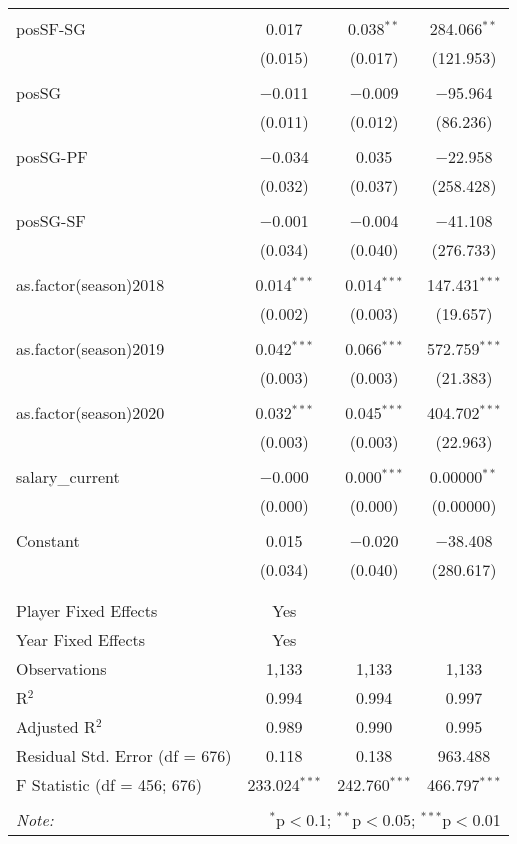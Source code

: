 \documentclass[a4paper,11pt]{article}
\begin{document}
\begin{table}[!htbp]
{\begin{tabular}{@{\extracolsep{5pt}}lccc}
  & & & \\ 
 posSF-SG & 0.017 & 0.038$^{**}$ & 284.066$^{**}$ \\ 
  & (0.015) & (0.017) & (121.953) \\ 
  & & & \\ 
 posSG & $-$0.011 & $-$0.009 & $-$95.964 \\ 
  & (0.011) & (0.012) & (86.236) \\ 
  & & & \\ 
 posSG-PF & $-$0.034 & 0.035 & $-$22.958 \\ 
  & (0.032) & (0.037) & (258.428) \\ 
  & & & \\ 
 posSG-SF & $-$0.001 & $-$0.004 & $-$41.108 \\ 
  & (0.034) & (0.040) & (276.733) \\ 
  & & & \\ 
 as.factor(season)2018 & 0.014$^{***}$ & 0.014$^{***}$ & 147.431$^{***}$ \\ 
  & (0.002) & (0.003) & (19.657) \\ 
  & & & \\ 
 as.factor(season)2019 & 0.042$^{***}$ & 0.066$^{***}$ & 572.759$^{***}$ \\ 
  & (0.003) & (0.003) & (21.383) \\ 
  & & & \\ 
 as.factor(season)2020 & 0.032$^{***}$ & 0.045$^{***}$ & 404.702$^{***}$ \\ 
  & (0.003) & (0.003) & (22.963) \\ 
  & & & \\ 
 salary\_current & $-$0.000 & 0.000$^{***}$ & 0.00000$^{**}$ \\ 
  & (0.000) & (0.000) & (0.00000) \\ 
  & & & \\ 
 Constant & 0.015 & $-$0.020 & $-$38.408 \\ 
  & (0.034) & (0.040) & (280.617) \\ 
  & & & \\ 
\hline \\[-1.8ex] 
Player Fixed Effects & Yes &  &  \\ 
Year Fixed Effects & Yes &  &  \\ 
Observations & 1,133 & 1,133 & 1,133 \\ 
R$^{2}$ & 0.994 & 0.994 & 0.997 \\ 
Adjusted R$^{2}$ & 0.989 & 0.990 & 0.995 \\ 
Residual Std. Error (df = 676) & 0.118 & 0.138 & 963.488 \\ 
F Statistic (df = 456; 676) & 233.024$^{***}$ & 242.760$^{***}$ & 466.797$^{***}$ \\ 
\hline 
\hline \\[-1.8ex] 
\textit{Note:}  & \multicolumn{3}{r}{$^{*}$p$<$0.1; $^{**}$p$<$0.05; $^{***}$p$<$0.01} \\ 
\end{tabular} }
\end{table} 
\end{document}
